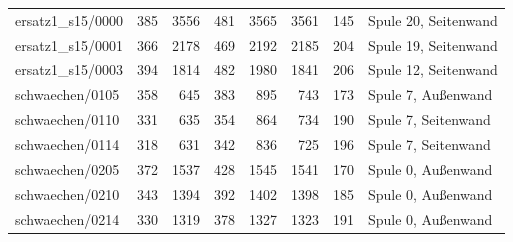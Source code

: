 \begin{tabular}{@{}lrrrrrrl@{}}
ersatz1\_s15/0000 & \num{385} & \num{3556} & \num{481} & \num{3565} & \num{3561} & \num{145} & Spule 20, Seitenwand \\
ersatz1\_s15/0001 & \num{366} & \num{2178} & \num{469} & \num{2192} & \num{2185} & \num{204} & Spule 19, Seitenwand \\
ersatz1\_s15/0003 & \num{394} & \num{1814} & \num{482} & \num{1980} & \num{1841} & \num{206} & Spule 12, Seitenwand \\
schwaechen/0105 & \num{358} & \num{645} & \num{383} & \num{895} & \num{743} & \num{173} & Spule 7, Außenwand \\
schwaechen/0110 & \num{331} & \num{635} & \num{354} & \num{864} & \num{734} & \num{190} & Spule 7, Seitenwand \\
schwaechen/0114 & \num{318} & \num{631} & \num{342} & \num{836} & \num{725} & \num{196} & Spule 7, Seitenwand \\
schwaechen/0205 & \num{372} & \num{1537} & \num{428} & \num{1545} & \num{1541} & \num{170} & Spule 0, Außenwand \\
schwaechen/0210 & \num{343} & \num{1394} & \num{392} & \num{1402} & \num{1398} & \num{185} & Spule 0, Außenwand \\
schwaechen/0214 & \num{330} & \num{1319} & \num{378} & \num{1327} & \num{1323} & \num{191} & Spule 0, Außenwand \\
\bottomrule\end{tabular}
